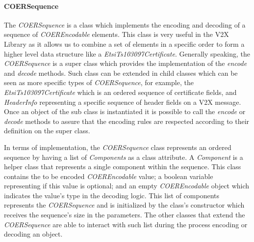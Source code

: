 \paragraph{COERSequence} The \textit{COERSequence} is a class which implements the encoding and decoding of a sequence of \textit{COEREncodable} elements. This class is very useful in the V2X Library as it allows us to combine a set of elements in a specific order to form a higher level data structure like a \textit{EtsiTs103097Certificate}. Generally speaking, the \textit{COERSequence} is a super class which provides the implementation of the \textit{encode} and \textit{decode} methods. Such class can be extended in child classes which can be seen as more specific types of \textit{COERSequence}, for example, the \textit{EtsiTs103097Certificate} which is an ordered sequence of certificate fields, and \textit{HeaderInfo} representing a specific sequence of header fields on a V2X message. Once an object of the sub class is instantiated it is possible to call the \textit{encode} or \textit{decode} methods to assure that the encoding rules are respected according to their definition on the super class. 

In terms of implementation, the \textit{COERSequence} class represents an ordered sequence by having a list of \textit{Components} as a class attribute. A \textit{Component} is a helper class that represents a single component within the sequence. This class contains the to be encoded \textit{COEREncodable} value; a boolean variable representing if this value is optional; and an empty \textit{COEREncodable} object which indicates the value's type in the decoding logic. This list of components represents the \textit{COERSequence} and is initialized by the class's constructor which receives the sequence's size in the parameters. The other classes that extend the \textit{COERSequence} are able to interact with such list during the process encoding or decoding an object. 

